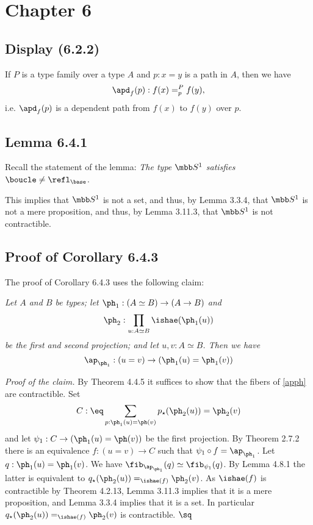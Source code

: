 \documentclass[12pt]{article}
\begin{document}


\section{Chapter 6}

\subsection{Display (6.2.2)}

If $P$ is a type family over a type $A$ and $p:x=y$ is a path in $A$, then we have 
$$
\apd_f(p):f(x)=^P_pf(y),
$$ 
i.e. $\apd_f(p)$ is a dependent path from $f(x)$ to $f(y)$ over $p$.


\subsection{Lemma 6.4.1}

Recall the statement of the lemma: \emph{The type $\mbb S^1$ satisfies} $\boucle\neq\refl_{\base}$. 

This implies that $\mbb S^1$ is not a set, and thus, by Lemma 3.3.4, that $\mbb S^1$ is not a mere proposition, and thus, by Lemma 3.11.3, that $\mbb S^1$ is not contractible.


\subsection{Proof of Corollary 6.4.3} %


The proof of Corollary 6.4.3 uses the following claim:

\nn\emph{Let $A$ and $B$ be types; let $\ph_1:(A\simeq B)\to(A\to B)$ and 
$$
\ph_2:\prod_{u:A\simeq B}\ishae(\ph_1(u))
$$ 
be the first and second projection; and let $u,v:A\simeq B$. Then we have} 
\begin{equation}\label{apph}
\ap_{\ph_1}:(u=v)\to(\ph_1(u)=\ph_1(v))
\end{equation}

\nn\emph{Proof of the claim.} By Theorem 4.4.5 it suffices to show that the fibers of \eqref{apph} are contractible. Set 
$$
C:\eq\sum_{p:\ph_1(u)=\ph(v)}p_\star(\ph_2(u))=\ph_2(v)
$$ 
and let $\psi_1:C\to(\ph_1(u)=\ph(v))$ be the first projection. By Theorem 2.7.2 there is an equivalence $f:(u=v)\to C$ such that $\psi_1\circ f=\ap_{\ph_1}$. Let $q:\ph_1(u)=\ph_1(v)$. We have $\fib_{\ap_{\ph_1}}(q)\simeq\fib_{\psi_1}(q)$. By Lemma 4.8.1 the latter is equivalent to $q_\star(\ph_2(u))=_{\ishae(f)}\ph_2(v)$. As $\ishae(f)$ is contractible by Theorem 4.2.13, Lemma 3.11.3 implies that it is a mere proposition, and Lemma 3.3.4 implies that it is a set. In particular $q_\star(\ph_2(u))=_{\ishae(f)}\ph_2(v)$ is contractible. $\sq$
\end{document}
